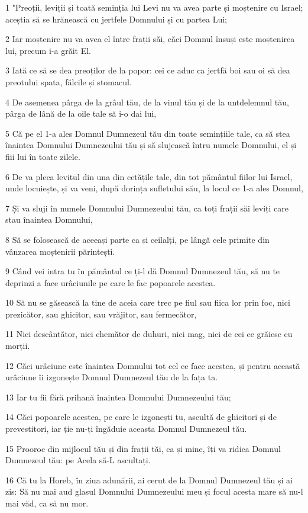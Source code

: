 \par 1 "Preoții, leviții și toată seminția lui Levi nu va avea parte și moștenire cu Israel; aceștia să se hrănească cu jertfele Domnului și cu partea Lui;
\par 2 Iar moștenire nu va avea el între frații săi, căci Domnul însuși este moștenirea lui, precum i-a grăit El.
\par 3 Iată ce să se dea preoților de la popor: cei ce aduc ca jertfă boi sau oi să dea preotului spata, fălcile și stomacul.
\par 4 De asemenea pârga de la grâul tău, de la vinul tău și de la untdelemnul tău, pârga de lână de la oile tale să i-o dai lui,
\par 5 Că pe el 1-a ales Domnul Dumnezeul tău din toate semințiile tale, ca să stea înaintea Domnului Dumnezeului tău și să slujească întru numele Domnului, el și fiii lui în toate zilele.
\par 6 De va pleca levitul din una din cetățile tale, din tot pământul fiilor lui Israel, unde locuiește, și va veni, după dorința sufletului său, la locul ce 1-a ales Domnul,
\par 7 Și va sluji în numele Domnului Dumnezeului tău, ca toți frații săi leviți care stau înaintea Domnului,
\par 8 Să se folosească de aceeași parte ca și ceilalți, pe lângă cele primite din vânzarea moștenirii părintești.
\par 9 Când vei intra tu în pământul ce ți-l dă Domnul Dumnezeul tău, să nu te deprinzi a face urâciunile pe care le fac popoarele acestea.
\par 10 Să nu se găsească la tine de aceia care trec pe fiul sau fiica lor prin foc, nici prezicător, sau ghicitor, sau vrăjitor, sau fermecător,
\par 11 Nici descântător, nici chemător de duhuri, nici mag, nici de cei ce grăiesc cu morții.
\par 12 Căci urâciune este înaintea Domnului tot cel ce face acestea, și pentru această urâciune îi izgonește Domnul Dumnezeul tău de la fața ta.
\par 13 Iar tu fii fără prihană înaintea Domnului Dumnezeului tău;
\par 14 Căci popoarele acestea, pe care le izgonești tu, ascultă de ghicitori și de prevestitori, iar ție nu-ți îngăduie aceasta Domnul Dumnezeul tău.
\par 15 Prooroc din mijlocul tău și din frații tăi, ca și mine, îți va ridica Domnul Dumnezeul tău: pe Acela să-L ascultați.
\par 16 Că tu la Horeb, în ziua adunării, ai cerut de la Domnul Dumnezeul tău și ai zis: Să nu mai aud glasul Domnului Dumnezeului meu și focul acesta mare să nu-l mai văd, ca să nu mor.
